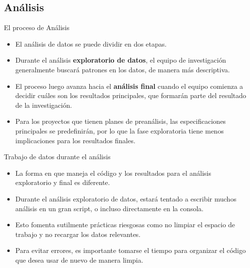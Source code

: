 \documentclass[10pt, aspectratio=169, compress]{beamer}
\begin{document}
\subsection{Análisis}
\begin{frame}{El proceso de Análisis}
	\begin{itemize}[<+->]
		\item El análisis de datos se puede dividir en dos etapas.
		\item Durante el análisis \textbf{exploratorio de datos}, el equipo de investigación generalmente buscará patrones en los datos, de manera más descriptiva.
		\item El proceso luego avanza hacia el \textbf{análisis final} cuando el equipo comienza a decidir cuáles son los resultados principales, que formarán parte del resultado de la investigación.
		\item Para los proyectos que tienen planes de preanálisis, las especificaciones principales se predefinirán, por lo que la fase exploratoria tiene menos implicaciones para los resultados finales.
	\end{itemize}
\end{frame}
\begin{frame}{Trabajo de datos durante el análisis}
	\begin{itemize}[<+->]
		\item La forma en que maneja el código y los resultados para el análisis exploratorio y final es diferente.
		\item Durante el análisis exploratorio de datos, estará tentado a escribir muchos análisis en un gran script, o incluso directamente en la consola.
		\item Esto fomenta sutilmente prácticas riesgosas como no limpiar el espacio de trabajo y no recargar los datos relevantes.
		\item Para evitar errores, es importante tomarse el tiempo para organizar el código que desea usar de nuevo de manera limpia.
	\end{itemize}
\end{frame}
\end{document}
